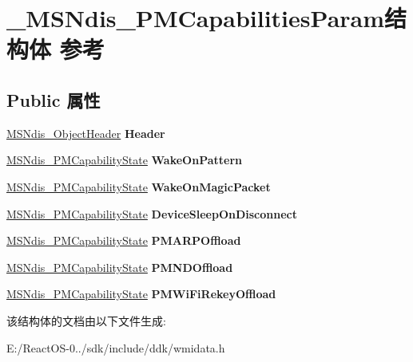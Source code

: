 \hypertarget{struct___m_s_ndis___p_m_capabilities_param}{}\section{\+\_\+\+M\+S\+Ndis\+\_\+\+P\+M\+Capabilities\+Param结构体 参考}
\label{struct___m_s_ndis___p_m_capabilities_param}
\subsection*{Public 属性}
\begin{DoxyCompactItemize}
\item 
\mbox{\label{struct___m_s_ndis___p_m_capabilities_param_ada1c33b8e46b685f83ae1245860e36f5}} 
\hyperlink{struct___m_s_ndis___object_header}{M\+S\+Ndis\+\_\+\+Object\+Header} {\bfseries Header}
\item 
\mbox{\label{struct___m_s_ndis___p_m_capabilities_param_ab6b7cbd30ec4c3b97af0407c51f9cc2d}} 
\hyperlink{struct___m_s_ndis___p_m_capability_state}{M\+S\+Ndis\+\_\+\+P\+M\+Capability\+State} {\bfseries Wake\+On\+Pattern}
\item 
\mbox{\label{struct___m_s_ndis___p_m_capabilities_param_a7e1c017e791b14d2a928ea4f3bde746f}} 
\hyperlink{struct___m_s_ndis___p_m_capability_state}{M\+S\+Ndis\+\_\+\+P\+M\+Capability\+State} {\bfseries Wake\+On\+Magic\+Packet}
\item 
\mbox{\label{struct___m_s_ndis___p_m_capabilities_param_abb681b702b9a00cef04e7904cdd40121}} 
\hyperlink{struct___m_s_ndis___p_m_capability_state}{M\+S\+Ndis\+\_\+\+P\+M\+Capability\+State} {\bfseries Device\+Sleep\+On\+Disconnect}
\item 
\mbox{\label{struct___m_s_ndis___p_m_capabilities_param_a4dc24d38837f19439f6d0f1b84657b4d}} 
\hyperlink{struct___m_s_ndis___p_m_capability_state}{M\+S\+Ndis\+\_\+\+P\+M\+Capability\+State} {\bfseries P\+M\+A\+R\+P\+Offload}
\item 
\mbox{\label{struct___m_s_ndis___p_m_capabilities_param_a7ddbb6bd5f4ad4d574308cdc0eeb4b46}} 
\hyperlink{struct___m_s_ndis___p_m_capability_state}{M\+S\+Ndis\+\_\+\+P\+M\+Capability\+State} {\bfseries P\+M\+N\+D\+Offload}
\item 
\mbox{\label{struct___m_s_ndis___p_m_capabilities_param_a603cec151c0db8202a079dec32e36727}} 
\hyperlink{struct___m_s_ndis___p_m_capability_state}{M\+S\+Ndis\+\_\+\+P\+M\+Capability\+State} {\bfseries P\+M\+Wi\+Fi\+Rekey\+Offload}
\end{DoxyCompactItemize}


该结构体的文档由以下文件生成\+:\begin{DoxyCompactItemize}
\item 
E\+:/\+React\+O\+S-\/0../sdk/include/ddk/wmidata.\+h\end{DoxyCompactItemize}
